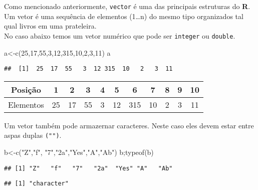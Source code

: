 \documentclass[
]{book}
\newenvironment{Shaded}{\begin{snugshade}}{\end{snugshade}}
\newcommand{\DecValTok}[1]{\textcolor[rgb]{0.00,0.00,0.81}{#1}}
\newcommand{\FunctionTok}[1]{\textcolor[rgb]{0.00,0.00,0.00}{#1}}
\newcommand{\NormalTok}[1]{#1}
\newcommand{\OtherTok}[1]{\textcolor[rgb]{0.56,0.35,0.01}{#1}}
\newcommand{\StringTok}[1]{\textcolor[rgb]{0.31,0.60,0.02}{#1}}
\begin{document}
Como mencionado anteriormente, \texttt{vector} é uma das principais estruturas do \textbf{R}. Um vetor é uma sequência de elementos (1\ldots n) do mesmo tipo organizados tal qual livros em uma prateleira.\\
No caso abaixo temos um vetor numérico que pode ser \texttt{integer} ou \texttt{double}.

\begin{Shaded}
\begin{Highlighting}[]
\NormalTok{a}\OtherTok{\textless{}{-}}\FunctionTok{c}\NormalTok{(}\DecValTok{25}\NormalTok{,}\DecValTok{17}\NormalTok{,}\DecValTok{55}\NormalTok{,}\DecValTok{3}\NormalTok{,}\DecValTok{12}\NormalTok{,}\DecValTok{315}\NormalTok{,}\DecValTok{10}\NormalTok{,}\DecValTok{2}\NormalTok{,}\DecValTok{3}\NormalTok{,}\DecValTok{11}\NormalTok{)}
\NormalTok{a}
\end{Highlighting}
\end{Shaded}

\begin{verbatim}
##  [1]  25  17  55   3  12 315  10   2   3  11
\end{verbatim}

\begin{longtable}[]{@{}ccccccccccc@{}}
\toprule
Posição & 1 & 2 & 3 & 4 & 5 & 6 & 7 & 8 & 9 & 10 \\
\midrule
\endhead
Elementos & 25 & 17 & 55 & 3 & 12 & 315 & 10 & 2 & 3 & 11 \\
\bottomrule
\end{longtable}

Um vetor também pode armazernar caracteres. Neste caso eles devem estar entre aspas duplas \texttt{("")}.

\begin{Shaded}
\begin{Highlighting}[]
\NormalTok{b}\OtherTok{\textless{}{-}}\FunctionTok{c}\NormalTok{(}\StringTok{"Z"}\NormalTok{,}\StringTok{"f"}\NormalTok{, }\StringTok{"7"}\NormalTok{,}\StringTok{"2a"}\NormalTok{,}\StringTok{"Yes"}\NormalTok{,}\StringTok{"A"}\NormalTok{,}\StringTok{"Ab"}\NormalTok{)}
\NormalTok{b;}\FunctionTok{typeof}\NormalTok{(b)}
\end{Highlighting}
\end{Shaded}

\begin{verbatim}
## [1] "Z"   "f"   "7"   "2a"  "Yes" "A"   "Ab"
\end{verbatim}

\begin{verbatim}
## [1] "character"
\end{verbatim}
\end{document}
